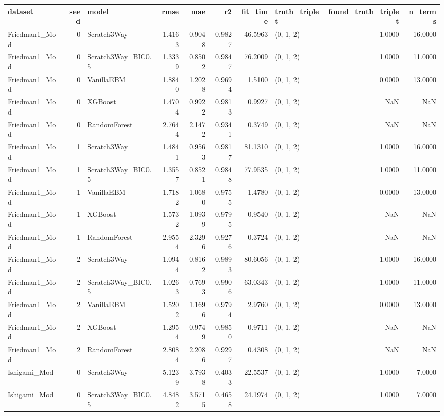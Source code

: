 \begin{tabular}{lrlrrrrlrr}
\toprule
dataset & seed & model & rmse & mae & r2 & fit_time & truth_triplet & found_truth_triplet & n_terms \\
\midrule
Friedman1_Mod & 0 & Scratch3Way & 1.4163 & 0.9048 & 0.9827 & 46.5963 & (0, 1, 2) & 1.0000 & 16.0000 \\
Friedman1_Mod & 0 & Scratch3Way_BIC0.5 & 1.3339 & 0.8502 & 0.9847 & 76.2009 & (0, 1, 2) & 1.0000 & 11.0000 \\
Friedman1_Mod & 0 & VanillaEBM & 1.8840 & 1.2028 & 0.9694 & 1.5100 & (0, 1, 2) & 0.0000 & 13.0000 \\
Friedman1_Mod & 0 & XGBoost & 1.4704 & 0.9922 & 0.9813 & 0.9927 & (0, 1, 2) & NaN & NaN \\
Friedman1_Mod & 0 & RandomForest & 2.7644 & 2.1472 & 0.9341 & 0.3749 & (0, 1, 2) & NaN & NaN \\
Friedman1_Mod & 1 & Scratch3Way & 1.4841 & 0.9563 & 0.9817 & 81.1310 & (0, 1, 2) & 1.0000 & 16.0000 \\
Friedman1_Mod & 1 & Scratch3Way_BIC0.5 & 1.3557 & 0.8521 & 0.9848 & 77.9535 & (0, 1, 2) & 1.0000 & 11.0000 \\
Friedman1_Mod & 1 & VanillaEBM & 1.7182 & 1.0680 & 0.9755 & 1.4780 & (0, 1, 2) & 0.0000 & 13.0000 \\
Friedman1_Mod & 1 & XGBoost & 1.5732 & 1.0939 & 0.9795 & 0.9540 & (0, 1, 2) & NaN & NaN \\
Friedman1_Mod & 1 & RandomForest & 2.9554 & 2.3296 & 0.9276 & 0.3724 & (0, 1, 2) & NaN & NaN \\
Friedman1_Mod & 2 & Scratch3Way & 1.0944 & 0.8162 & 0.9893 & 80.6056 & (0, 1, 2) & 1.0000 & 16.0000 \\
Friedman1_Mod & 2 & Scratch3Way_BIC0.5 & 1.0263 & 0.7693 & 0.9906 & 63.0343 & (0, 1, 2) & 1.0000 & 11.0000 \\
Friedman1_Mod & 2 & VanillaEBM & 1.5202 & 1.1696 & 0.9794 & 2.9760 & (0, 1, 2) & 0.0000 & 13.0000 \\
Friedman1_Mod & 2 & XGBoost & 1.2954 & 0.9749 & 0.9850 & 0.9711 & (0, 1, 2) & NaN & NaN \\
Friedman1_Mod & 2 & RandomForest & 2.8084 & 2.2086 & 0.9297 & 0.4308 & (0, 1, 2) & NaN & NaN \\
Ishigami_Mod & 0 & Scratch3Way & 5.1239 & 3.7938 & 0.4033 & 22.5537 & (0, 1, 2) & 1.0000 & 7.0000 \\
Ishigami_Mod & 0 & Scratch3Way_BIC0.5 & 4.8482 & 3.5715 & 0.4658 & 24.1974 & (0, 1, 2) & 1.0000 & 7.0000 \\

\end{tabular}
